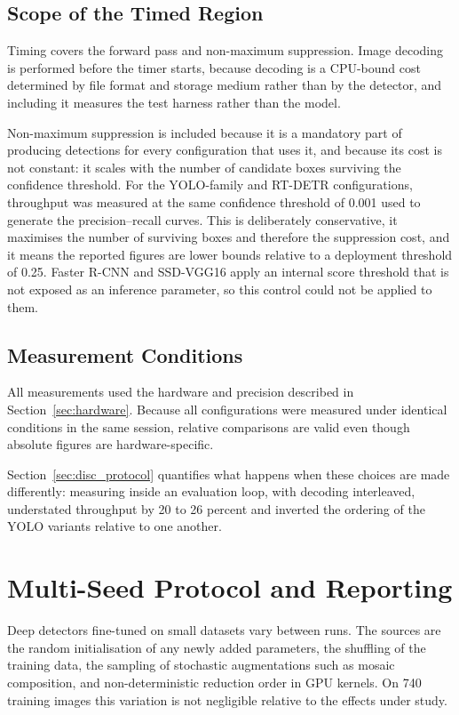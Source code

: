 \documentclass[MScCS]{uccthesis}
\begin{document}
\subsection{Scope of the Timed Region}

Timing covers the forward pass and non-maximum suppression. Image decoding is
performed before the timer starts, because decoding is a CPU-bound cost
determined by file format and storage medium rather than by the detector, and
including it measures the test harness rather than the model.

Non-maximum suppression is included because it is a mandatory part of producing
detections for every configuration that uses it, and because its cost is not
constant: it scales with the number of candidate boxes surviving the confidence
threshold. For the YOLO-family and RT-DETR configurations, throughput was
measured at the same confidence threshold of 0.001 used to generate the
precision--recall curves. This is deliberately conservative, it maximises the
number of surviving boxes and therefore the suppression cost, and it means
the reported figures are lower bounds relative to a deployment threshold of
0.25. Faster R-CNN and SSD-VGG16 apply an internal score threshold that is not
exposed as an inference parameter, so this control could not be applied to
them.

\subsection{Measurement Conditions}

All measurements used the hardware and precision described in
Section~\ref{sec:hardware}. Because all configurations were measured under
identical conditions in the same session, relative comparisons are valid even
though absolute figures are hardware-specific.

Section~\ref{sec:disc_protocol} quantifies what happens when these choices are
made differently: measuring inside an evaluation loop, with decoding
interleaved, understated throughput by 20 to 26 percent and inverted the
ordering of the YOLO variants relative to one another.

\section{Multi-Seed Protocol and Reporting}
\label{sec:seeds}

Deep detectors fine-tuned on small datasets vary between runs. The sources are
the random initialisation of any newly added parameters, the shuffling of the
training data, the sampling of stochastic augmentations such as mosaic
composition, and non-deterministic reduction order in GPU kernels. On 740
training images this variation is not negligible relative to the effects under
study.
\end{document}
